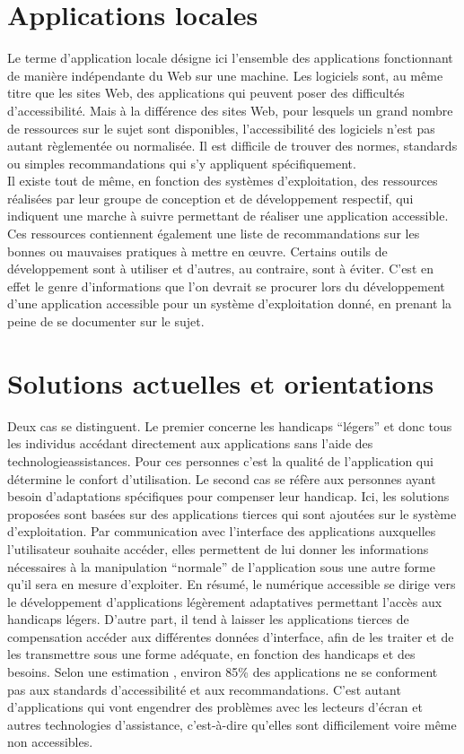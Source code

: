 \documentclass[french,a4paper]{report}
\begin{document}
\section{Applications locales}
Le terme d'application locale désigne ici l'ensemble des applications fonctionnant de manière
indépendante du Web sur une machine. Les logiciels sont, au même titre que les sites Web, des
applications qui peuvent poser des difficultés d'accessibilité. Mais à la différence des sites
Web, pour lesquels un grand nombre de ressources sur le sujet sont disponibles, l'accessibilité
des logiciels n'est pas autant règlementée ou normalisée. Il est difficile de trouver des normes,
standards ou simples recommandations qui s'y appliquent spécifiquement.\\
Il existe tout de même, en fonction des systèmes d'exploitation, des ressources réalisées par
leur groupe de conception et de développement respectif, qui indiquent une marche à suivre permettant
de réaliser une application accessible. Ces ressources contiennent également une liste de
recommandations sur les bonnes ou mauvaises pratiques à mettre en œuvre. Certains outils
de développement sont à utiliser et d'autres, au contraire, sont à éviter. C'est en effet le genre
d'informations que l'on
devrait se procurer lors du développement d'une application accessible
pour un système d'exploitation donné, en prenant la peine de se documenter sur le sujet.
\section{Solutions actuelles et orientations}
Deux cas se distinguent. Le premier concerne les handicaps \enquote{légers} et donc tous les individus
accédant directement aux applications sans l'aide des \glspl{technologieassistance}.
Pour ces personnes c'est la qualité de l'application qui détermine le confort d'utilisation.
\newline
Le second cas se réfère aux personnes ayant besoin d'adaptations spécifiques pour compenser leur
handicap.
Ici, les solutions proposées sont basées sur des applications tierces qui sont ajoutées
sur le système d'exploitation. Par communication avec l'interface des applications
auxquelles l'utilisateur souhaite accéder, elles permettent de lui donner les informations
nécessaires à la manipulation \enquote{normale} de l'application sous une autre forme qu'il sera
en mesure d'exploiter.
\newline
En résumé, le numérique accessible se dirige vers le développement d'applications légèrement
adaptatives permettant l'accès aux handicaps légers. D'autre part, il tend à laisser les applications
tierces de compensation accéder aux différentes données d'interface, afin de les traiter et de
les transmettre sous une forme adéquate, en fonction des handicaps et des besoins.
\newline
Selon une estimation \cite{appelaccessgnu}, environ 85\%
des applications ne se conforment pas aux standards d'accessibilité et aux
recommandations. C'est autant d'applications qui vont engendrer des problèmes
avec les lecteurs d'écran et autres technologies d'assistance, c'est-à-dire
qu'elles sont difficilement voire même non accessibles.
\end{document}
